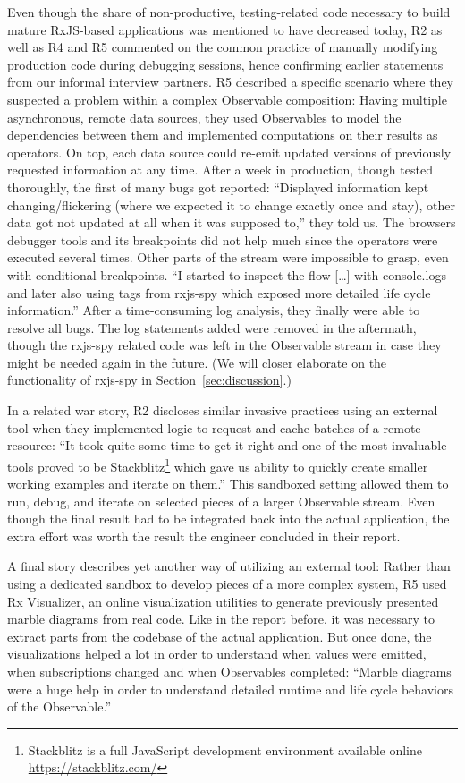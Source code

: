 \documentclass[12pt,a4paper]{article}
\begin{document}
Even though the share of non-productive, testing-related code necessary to build mature RxJS-based applications was mentioned to have decreased today, R2 as well as R4 and R5 commented on the common practice of manually modifying production code during debugging sessions, hence confirming earlier statements from our informal interview partners. R5 described a specific scenario where they suspected a problem within a complex Observable composition: Having multiple asynchronous, remote data sources, they used Observables to model the dependencies between them and implemented computations on their results as operators. On top, each data source could re-emit updated versions of previously requested information at any time. After a week in production, though tested thoroughly, the first of many bugs got reported: ``Displayed information kept changing/flickering (where we expected it to change exactly once and stay), other data got not updated at all when it was supposed to,'' they told us. The browsers debugger tools and its breakpoints did not help much since the operators were executed several times. Other parts of the stream were impossible to grasp, even with conditional breakpoints. ``I started to inspect the flow [\dots] with console.logs and later also using tags from rxjs-spy which exposed more detailed life cycle information.'' After a time-consuming log analysis, they finally were able to resolve all bugs. The log statements added were removed in the aftermath, though the rxjs-spy related code was left in the Observable stream in case they might be needed again in the future. (We will closer elaborate on the functionality of rxjs-spy in Section~\ref{sec:discussion}.)

In a related war story, R2 discloses similar invasive practices using an external tool when they implemented logic to request and cache batches of a remote resource: ``It took quite some time to get it right and one of the most invaluable tools proved to be Stackblitz\footnote{Stackblitz is a full JavaScript development environment available online \url{https://stackblitz.com/}} which gave us ability to quickly create smaller working examples and iterate on them.'' This sandboxed setting allowed them to run, debug, and iterate on selected pieces of a larger Observable stream. Even though the final result had to be integrated back into the actual application, the extra effort was worth the result the engineer concluded in their report.

A final story describes yet another way of utilizing an external tool: Rather than using a dedicated sandbox to develop pieces of a more complex system, R5 used Rx Visualizer, an online visualization utilities to generate previously presented marble diagrams from real code. Like in the report before, it was necessary to extract parts from the codebase of the actual application. But once done, the visualizations helped a lot in order to understand when values were emitted, when subscriptions changed and when Observables completed: ``Marble diagrams were a huge help in order to understand detailed runtime and life cycle behaviors of the Observable.''
\end{document}
